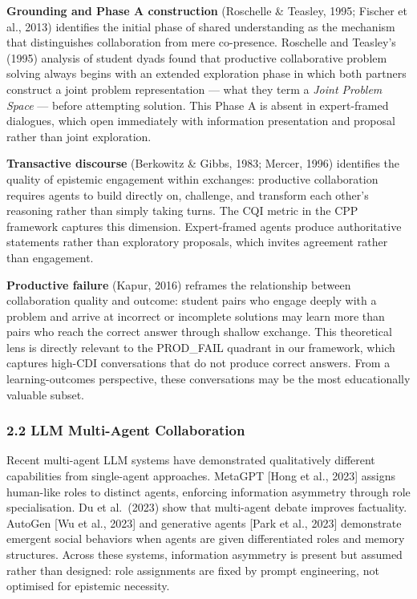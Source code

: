 \documentclass[
  11pt,
]{article}
\begin{document}
\textbf{Grounding and Phase A construction} (Roschelle \& Teasley, 1995; Fischer et al., 2013) identifies the initial phase of shared understanding as the mechanism that distinguishes collaboration from mere co-presence. Roschelle and Teasley's (1995) analysis of student dyads found that productive collaborative problem solving always begins with an extended exploration phase in which both partners construct a joint problem representation --- what they term a \emph{Joint Problem Space} --- before attempting solution. This Phase A is absent in expert-framed dialogues, which open immediately with information presentation and proposal rather than joint exploration.

\textbf{Transactive discourse} (Berkowitz \& Gibbs, 1983; Mercer, 1996) identifies the quality of epistemic engagement within exchanges: productive collaboration requires agents to build directly on, challenge, and transform each other's reasoning rather than simply taking turns. The CQI metric in the CPP framework captures this dimension. Expert-framed agents produce authoritative statements rather than exploratory proposals, which invites agreement rather than engagement.

\textbf{Productive failure} (Kapur, 2016) reframes the relationship between collaboration quality and outcome: student pairs who engage deeply with a problem and arrive at incorrect or incomplete solutions may learn more than pairs who reach the correct answer through shallow exchange. This theoretical lens is directly relevant to the PROD\_FAIL quadrant in our framework, which captures high-CDI conversations that do not produce correct answers. From a learning-outcomes perspective, these conversations may be the most educationally valuable subset.

\subsubsection{2.2 LLM Multi-Agent
Collaboration}\label{llm-multi-agent-collaboration}

Recent multi-agent LLM systems have demonstrated qualitatively different capabilities from single-agent approaches. MetaGPT [Hong et al., 2023] assigns human-like roles to distinct agents, enforcing information asymmetry through role specialisation. Du et al.\ (2023) show that multi-agent debate improves factuality. AutoGen [Wu et al., 2023] and generative agents [Park et al., 2023] demonstrate emergent social behaviors when agents are given differentiated roles and memory structures. Across these systems, information asymmetry is present but assumed rather than designed: role assignments are fixed by prompt engineering, not optimised for epistemic necessity.
\end{document}
